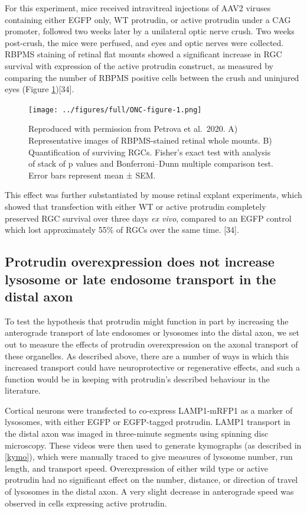 \documentclass[
  12pt,
  a4paper,
]{book}
\begin{document}
For this experiment, mice received intravitreal injections of AAV2 viruses containing either EGFP only, WT protrudin, or active protrudin under a CAG promoter, followed two weeks later by a unilateral optic nerve crush. Two weeks post-crush, the mice were perfused, and eyes and optic nerves were collected. RBPMS staining of retinal flat mounts showed a significant increase in RGC survival with expression of the active protrudin construct, as measured by comparing the number of RBPMS positive cells between the crush and uninjured eyes (Figure \ref{fig:ONC-figure}){[}34{]}.

\begin{figure}
\centering
\texttt{[image: ../figures/full/ONC-figure-1.png]}
\caption{\label{fig:ONC-figure}Reproduced with permission from Petrova et al.~2020. A) Representative images of RBPMS-stained retinal whole mounts. B) Quantification of surviving RGCs. Fisher's exact test with analysis of stack of p values and Bonferroni--Dunn multiple comparison test. Error bars represent mean ± SEM.}
\end{figure}

This effect was further substantiated by mouse retinal explant experiments, which showed that transfection with either WT or active protrudin completely preserved RGC survival over three days \emph{ex vivo}, compared to an EGFP control which lost approximately 55\% of RGCs over the same time. {[}34{]}.

\hypertarget{lyso-LE}{%
\subsection{Protrudin overexpression does not increase lysosome or late endosome transport in the distal axon}\label{lyso-LE}}

To test the hypothesis that protrudin might function in part by increasing the anterograde transport of late endosomes or lysosomes into the distal axon, we set out to measure the effects of protrudin overexpression on the axonal transport of these organelles. As described above, there are a number of ways in which this increased transport could have neuroprotective or regenerative effects, and such a function would be in keeping with protrudin's described behaviour in the literature.

Cortical neurons were transfected to co-express LAMP1-mRFP1 as a marker of lysosomes, with either EGFP or EGFP-tagged protrudin. LAMP1 transport in the distal axon was imaged in three-minute segments using spinning disc microscopy. These videos were then used to generate kymographs (as described in \ref{kymo}), which were manually traced to give measures of lysosome number, run length, and transport speed. Overexpression of either wild type or active protrudin had no significant effect on the number, distance, or direction of travel of lysosomes in the distal axon. A very slight decrease in anterograde speed was observed in cells expressing active protrudin.
\end{document}
